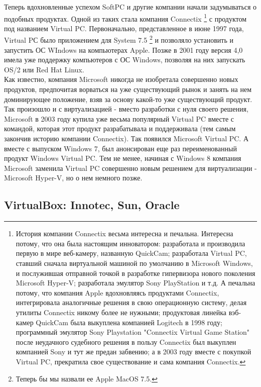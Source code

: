 \documentclass[14pt, a4paper]{article}
\begin{document}
Теперь вдохновленные успехом SoftPC и другие компании начали задумываться о
подобных продуктах. Одной из таких стала компания Connectix \footnote{История компании Connectix весьма интересна и печальна. Интересна потому, что она была
настоящим инноватором: разработала и производила первую в мире веб-камеру, названную
QuickCam; разработала Virtual PC, ставший сначала виртуальной машиной по умолчанию в
Microsoft Windows, и послужившая отправной точкой в разработке гипервизора нового
поколения Microsoft Hyper-V; разработала эмулятор Sony PlayStation и т.д. А печальна потому,
что компания Apple вдохновляясь продуктами Connectix, интегрировала аналогичные решения
в свою операционную систему, делая утилиты Connectix никому более не нужными;
продуктовая линейка вэб-камер QuickCam была выкуплена компанией Logitech в 1998 году;
программный эмулятор Sony Playstation "Connectix Virtual Game Station" после неудачного
судебного решения в пользу Connectix был выкуплен компанией Sony и тут же предан
забвению; а в 2003 году вместе с покупкой Virtual PC, прекратила свое существование и сама
компания Connectix.} с продуктом под названием Virtual PC. Первоначально, 
представленное в июне 1997 года, Virtual PС было приложением для System 7.5 \footnote{Теперь бы мы назвали ее Apple MacOS 7.5.} 
и позволяло установить и запустить ОС WIndows
на компьютерах Apple. Позже в 2001 году версия 4,0 имела уже поддержку
компьютеров с ОС Windows, позволяя на них запускать OS/2 или Red Hat Linux.\\

Как известно, компания Microsoft никогда не изобретала совершенно новых продуктов,
предпочитая ворваться на уже существующий рынок и занять на нем доминирующее
положение, взяв за основу какой-то уже существующий продукт. Так произошло и с
виртуализацией - вместо разработки с нуля своего решения, Microsoft в 2003 году
купила уже весьма популярный Virtual PC вместе с командой, которая этот продукт
разрабатывала и поддерживала (тем самым закончив историю компании Connectix).
Так появился Microsoft Virtual PC. А вместе с выпуском Windows 7, был анонсирован
еще раз переименованный продукт Windows Virtual PC. Тем не менее, начиная с Windows 8 компания Microsoft заменила Virtual PC совершенно новым решением для
виртуализации - Microsoft Hyper-V, но о нем немного позже.\\

\subsection*{VirtualBox: Innotec, Sun, Oracle}
\end{document}
